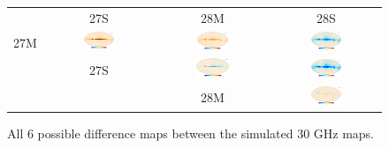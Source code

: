 \documentclass{aa}
\begin{document}
\begin{figure}
\begin{tabular}{B C C C}
& 27S & 28M & 28S\\
  27M & \includegraphics[width=0.30\textwidth]{figs/sim_27M_minus_27S.pdf} & 
\includegraphics[width=0.30\textwidth]{figs/sim_27M_minus_28M.pdf} &
\includegraphics[width=0.31\textwidth]{figs/sim_27M_minus_28S.pdf}\\
 & \hspace{4.8cm } 27S & \includegraphics[width=0.31\textwidth]{figs/sim_27S_minus_28M.pdf} &
 \includegraphics[width=0.31\textwidth]{figs/sim_27S_minus_28S.pdf}\\
 & \caption{All 6 possible difference maps between the simulated 30 GHz maps. } &  \hspace{4.7cm }  28M  & \includegraphics[width=0.31\textwidth]{figs/28M_minus_28S_depol.pdf} \\
  \end{tabular}
\vspace{-0.75cm}
      \label{fig:bp_diffs}
\end{figure}
\end{document}
